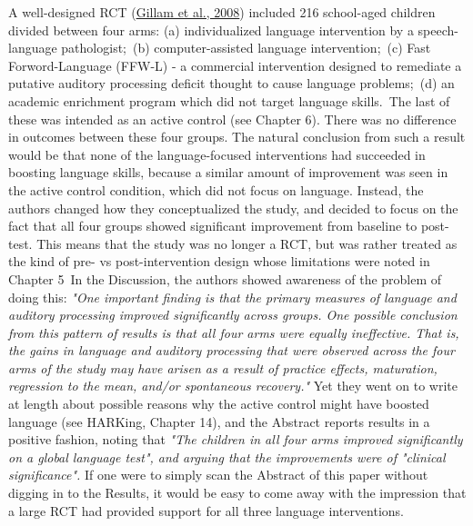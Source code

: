 \documentclass{krantz}
\begin{document}
\begin{tcolorbox}[colback=Black!5!lightgray,colframe=black!75!black,coltitle=white,title=An example of spin in evaluating speech and language therapy]\label{box:spin}
A well-designed RCT (\protect\hyperlink{ref-gillam2008}{Gillam et al., 2008}) included 216 school-aged children divided between four arms:  
(a) individualized language intervention by a speech-language pathologist;\
(b) computer-assisted language intervention;\
(c) Fast Forword-Language (FFW-L) - a commercial intervention designed to remediate a putative auditory processing deficit thought to cause language problems;\
(d) an academic enrichment program which did not target language skills.\
The last of these was intended as an active control (see Chapter 6). There was no difference in outcomes between these four groups. The natural conclusion from such a result would be that none of the language-focused interventions had succeeded in boosting language skills, because a similar amount of improvement was seen in the active control condition, which did not focus on language. Instead, the authors changed how they conceptualized the study, and decided to focus on the fact that all four groups showed significant improvement from baseline to post-test. This means that the study was no longer a RCT, but was rather treated as the kind of pre- vs post-intervention design whose limitations were noted in Chapter 5\
In the Discussion, the authors showed awareness of the problem of doing this: \textit{"One important finding is that the primary measures of language and auditory processing improved significantly across groups. One possible conclusion from this pattern of results is that all four arms were equally ineffective. That is, the gains in language and auditory processing that were observed across the four arms of the study may have arisen as a result of practice effects, maturation, regression to the mean, and/or spontaneous recovery."} Yet they went on to write at length about possible reasons why the active control might have boosted language (see HARKing, Chapter 14), and the Abstract reports results in a positive fashion, noting that \textit{"The children in all four arms improved significantly on a global language test", and arguing that the improvements were of "clinical significance".} If one were to simply scan the Abstract of this paper without digging in to the Results, it would be easy to come away with the impression that a large RCT had provided support for all three language interventions.

\end{tcolorbox}
\end{document}
